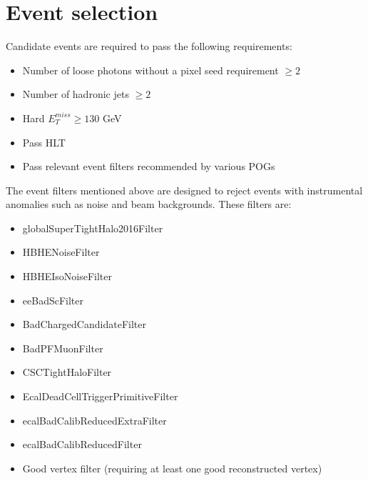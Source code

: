 \label{section:jetdefinition}

\section{Event selection}
Candidate events are required to pass the following requirements:
\begin{itemize}
	\item Number of loose photons without a pixel seed requirement $\geq 2$
	\item Number of hadronic jets $\geq 2$
	\item Hard $E_T^{miss} \geq 130$ GeV
	\item Pass HLT
	\item Pass relevant event filters recommended by various POGs
\end{itemize}
The event filters mentioned above are designed to reject events with instrumental anomalies such as noise and beam backgrounds.  These filters are:
\begin{itemize}
	\item globalSuperTightHalo2016Filter
	\item HBHENoiseFilter
	\item HBHEIsoNoiseFilter
	\item eeBadScFilter
	\item BadChargedCandidateFilter
	\item BadPFMuonFilter
	\item CSCTightHaloFilter
	\item EcalDeadCellTriggerPrimitiveFilter
	\item ecalBadCalibReducedExtraFilter
	\item ecalBadCalibReducedFilter
	\item Good vertex filter (requiring at least one good reconstructed vertex)
\end{itemize}

